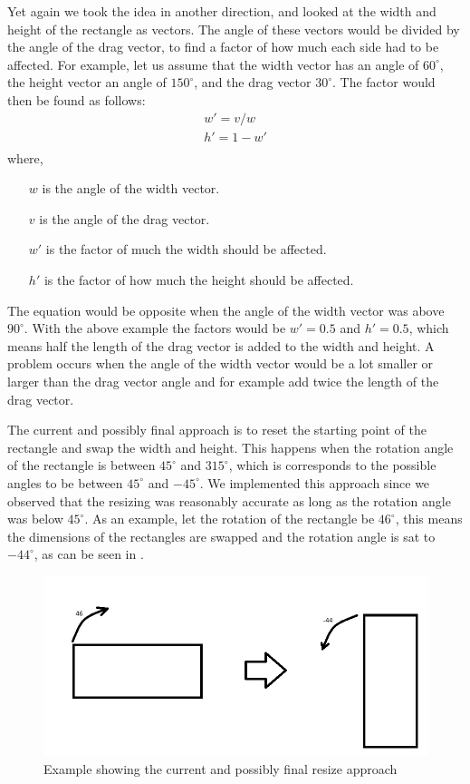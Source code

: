 Yet again we took the idea in another direction, and looked at the width and height of the rectangle as vectors.
The angle of these vectors would be divided by the angle of the drag vector, to find a factor of how much each side had to be affected.
For example, let us assume that the width vector has an angle of $60^\circ$, the height vector an angle of $150^\circ$, and the drag vector $30^\circ$.
The factor would then be found as follows:
\begin{equation}
\begin{aligned}
w' = v / w\\
h' = 1 - w'\\
\end{aligned}
\end{equation}
where, 
\begin{itemize}
\item[$w$] is the angle of the width vector.
\item[$v$] is the angle of the drag vector.
\item[$w'$] is the factor of much the width should be affected.
\item[$h'$] is the factor of how much the height should be affected.
\end{itemize}
The equation would be opposite when the angle of the width vector was above $90^\circ$.
With the above example the factors would be $w' = 0.5$ and $h' = 0.5$, which means half the length of the drag vector is added to the width and height.
A problem occurs when the angle of the width vector would be a lot smaller or larger than the drag vector angle and for example add twice the length of the drag vector.

The current and possibly final approach is to reset the starting point of the rectangle and swap the width and height.
This happens when the rotation angle of the rectangle is between $45^\circ$ and $315^\circ$, which is corresponds to the possible angles to be between $45^\circ$ and $-45^\circ$.
We implemented this approach since we observed that the resizing was reasonably accurate as long as the rotation angle was below $45^\circ$.
As an example, let the rotation of the rectangle be $46^\circ$, this means the dimensions of the rectangles are swapped and the rotation angle is sat to $-44^\circ$, as can be seen in .
\begin{figure}
\includegraphics[scale=0.5]{media/approach6}
\caption{Example showing the current and possibly final resize approach}
\label{fig:app6}
\end{figure}
